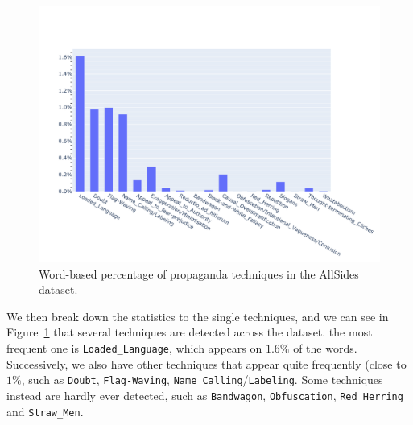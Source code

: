 
\begin{figure}[!htbp]
    \centering
    \includegraphics[width=\linewidth]{figures/prop_tech_detail_baly.pdf}
    \caption{Word-based percentage of propaganda techniques in the AllSides dataset.}
    \label{fig:prop_tech_detail_baly}
\end{figure}

We then break down the statistics to the single techniques, and we can see in Figure~\ref{fig:prop_tech_detail_baly} that several techniques are detected across the dataset.
the most frequent one is \texttt{Loaded\_Language}, which appears on $1.6\%$ of the words.
Successively, we also have other techniques that appear quite frequently (close to $1\%$, such as \texttt{Doubt}, \texttt{Flag-Waving}, \texttt{Name\_Calling}/\texttt{Labeling}. Some techniques instead are hardly ever detected, such as \texttt{Bandwagon}, \texttt{Obfuscation}, \texttt{Red\_Herring} and \texttt{Straw\_Men}.






